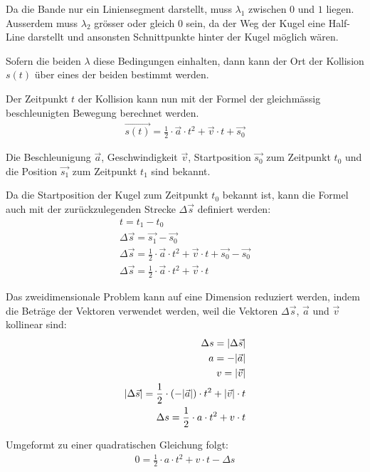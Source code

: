 Da die Bande nur ein Liniensegment darstellt, muss $\lambda_1$ zwischen $0$ und $1$ liegen.
Ausserdem muss $\lambda_2$ grösser oder gleich $0$ sein, da der Weg der Kugel eine Half-Line darstellt und ansonsten
Schnittpunkte hinter der Kugel möglich wären.

Sofern die beiden $\lambda$ diese Bedingungen einhalten, dann kann der Ort der Kollision $s(t)$ über eines der beiden bestimmt werden.

Der Zeitpunkt $t$ der Kollision kann nun mit der Formel der gleichmässig beschleunigten Bewegung berechnet werden.
\begin{align}
    \vec{s(t)} = \frac{1}{2} \cdot \vec{a} \cdot t^2 + \vec{v} \cdot t + \vec{s_0}
\end{align}

Die Beschleunigung $\vec{a}$, Geschwindigkeit $\vec{v}$, Startposition $\vec{s_0}$ zum Zeitpunkt $t_0$
und die Position $\vec{s_1}$ zum Zeitpunkt $t_1$ sind bekannt.

Da die Startposition der Kugel zum Zeitpunkt $t_0$ bekannt ist,
kann die Formel auch mit der zurückzulegenden Strecke $\Delta \vec{s}$ definiert werden:
\begin{align}
    t = t_1 - t_0\\
    \Delta \vec{s} = \vec{s_1} - \vec{s_0}\\
    \Delta \vec{s} = \frac{1}{2} \cdot \vec{a} \cdot t^2 + \vec{v} \cdot t + \vec{s_0} - \vec{s_0}\\
    \Delta \vec{s} = \frac{1}{2} \cdot \vec{a} \cdot t^2 + \vec{v} \cdot t
\end{align}

Das zweidimensionale Problem kann auf eine Dimension reduziert werden, indem die Beträge der Vektoren verwendet werden,
weil die Vektoren $\Delta \vec{s}$, $\vec{a}$ und $\vec{v}$ kollinear sind:
\begin{align}
    \Delta s = \lvert \Delta \vec{s} \rvert\\
    a = -\lvert \vec{a} \rvert\\
    v = \lvert \vec{v} \rvert\\
    \lvert \Delta \vec{s} \rvert = \frac{1}{2} \cdot (-\lvert \vec{a} \rvert) \cdot t^2 + \lvert \vec{v} \rvert \cdot t\\
    \Delta s = \frac{1}{2} \cdot a \cdot t^2 + v \cdot t
\end{align}

Umgeformt zu einer quadratischen Gleichung folgt:
\begin{align}
    0 = \frac{1}{2} \cdot a \cdot t^2 + v \cdot t - \Delta s
\end{align}

